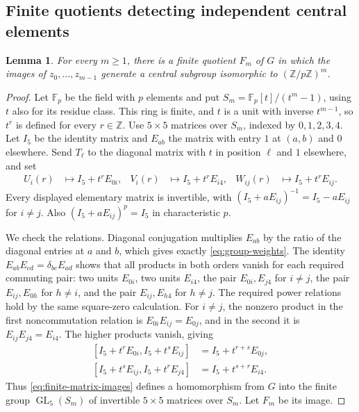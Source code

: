 \documentclass[11pt]{article}
\numberwithin{equation}{section}
\newtheorem{lemma}[theorem]{Lemma}
\theoremstyle{definition}
\theoremstyle{remark}
\newcommand{\F}{\mathbb F}
\newcommand{\Z}{\mathbb Z}
\begin{document}
\subsection{Finite quotients detecting independent central elements}

\begin{lemma}
\label{lem:finite-central-quotients}
For every $m\geq1$, there is a finite quotient $F_m$ of $G$ in which
the images of $z_0,\ldots,z_{m-1}$ generate a central subgroup
isomorphic to $(\Z/p\Z)^m$.
\end{lemma}

\begin{proof}
Let $\F_p$ be the field with $p$ elements and put
$S_m=\F_p[t]/(t^m-1)$, using $t$ also for its residue class.
This ring is finite, and $t$ is a unit
with inverse $t^{m-1}$, so $t^r$ is defined for every $r\in\Z$.
Use $5\times5$ matrices over $S_m$, indexed by $0,1,2,3,4$.
Let $I_5$ be the identity matrix and $E_{ab}$ the matrix with entry
$1$ at $(a,b)$ and $0$ elsewhere. Send $T_\ell$ to the diagonal
matrix with $t$ in position $\ell$ and $1$ elsewhere, and set
\begin{equation}
\begin{aligned}
 U_i(r)&\longmapsto I_5+t^rE_{0i},&
 V_i(r)&\longmapsto I_5+t^rE_{i4},&
 W_{ij}(r)&\longmapsto I_5+t^rE_{ij}.
\end{aligned}
\label{eq:finite-matrix-images}
\end{equation}
Every displayed elementary matrix is invertible, with
$(I_5+aE_{ij})^{-1}=I_5-aE_{ij}$ for $i\ne j$.
Also $(I_5+aE_{ij})^p=I_5$ in characteristic $p$.

We check the relations.  Diagonal conjugation multiplies $E_{ab}$
by the ratio of the diagonal entries at $a$ and $b$, which gives
exactly \eqref{eq:group-weights}.  The identity
$E_{ab}E_{cd}=\delta_{bc}E_{ad}$ shows that all products in both
orders vanish for each required commuting pair: two units $E_{0i}$,
two units $E_{i4}$, the pair $E_{0i},E_{j4}$ for $i\neq j$, the pair
$E_{ij},E_{0h}$ for $h\neq i$, and the pair $E_{ij},E_{h4}$ for
$h\neq j$.  The required power relations hold by the same
square-zero calculation.  For $i\neq j$, the nonzero product in the
first noncommutation relation is $E_{0i}E_{ij}=E_{0j}$, and in the
second it is $E_{ij}E_{j4}=E_{i4}$.  The higher products vanish,
giving
\[
\begin{aligned}
 [I_5+t^rE_{0i},I_5+t^sE_{ij}]&=I_5+t^{r+s}E_{0j},\\
 [I_5+t^sE_{ij},I_5+t^rE_{j4}]&=I_5+t^{s+r}E_{i4}.
\end{aligned}
\]
Thus \eqref{eq:finite-matrix-images} defines a homomorphism from
$G$ into the finite group $\operatorname{GL}_5(S_m)$ of invertible
$5\times5$ matrices over $S_m$.  Let $F_m$
be its image.


\end{proof}
\end{document}

